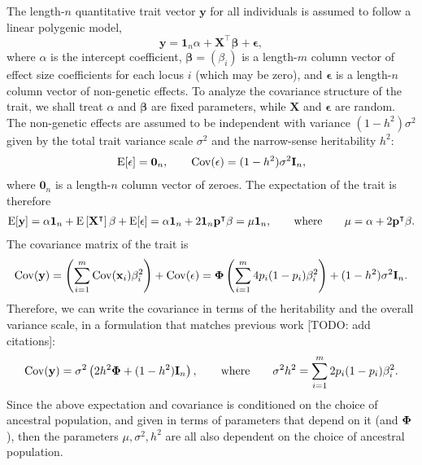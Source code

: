 \documentclass[11pt]{article}
\newcommand{\kinMat}{%
  \ensuremath{%
    \mathbf{\Phi}
  }%
  \xspace%
}%
\begin{document}
The length-$n$ quantitative trait vector $\mathbf{y}$ for all individuals is assumed to follow a linear polygenic model,
\begin{equation}
  \label{eq:trait}
  \mathbf{y}
  =
  \mathbf{1}_n \alpha + \mathbf{X}^\intercal \mathbf{\beta}  + \mathbf{\epsilon},
\end{equation}
where $\alpha$ is the intercept coefficient, $\mathbf{\beta} = (\beta_i)$ is a length-$m$ column vector of effect size coefficients for each locus $i$ (which may be zero), and $\mathbf{\epsilon}$ is a length-$n$ column vector of non-genetic effects.
To analyze the covariance structure of the trait, we shall treat $\alpha$ and $\mathbf{\beta}$ are fixed parameters, while $\mathbf{X}$ and $\mathbf{\epsilon}$ are random.
The non-genetic effects are assumed to be independent with variance $(1-h^2) \sigma^2$ given by the total trait variance scale $\sigma^2$ and the narrow-sense heritability $h^2$:
\begin{align*}
  \operatorname{E}[\mathbf{\epsilon}]
  =
  \mathbf{0}_n
  ,
  \quad\quad
  \operatorname{Cov}(\mathbf{\epsilon})
  =
  (1-h^2) \sigma^2 \mathbf{I}_n
  ,
\end{align*}
where $\mathbf{0}_n$ is a length-$n$ column vector of zeroes.
The expectation of the trait is therefore
\begin{align*}
  \operatorname{E}[\mathbf{y}]
  = \alpha \mathbf{1}_n + \operatorname{E} \left[ \mathbf{X}^\intercal \right] \mathbf{\beta} + \operatorname{E}[\mathbf{\epsilon}]
  = \alpha \mathbf{1}_n + 2 \mathbf{1}_n \mathbf{p}^\intercal \mathbf{\beta}
  = \mu \mathbf{1}_n
  , \quad\quad \text{where} \quad\quad
  \mu 
  =
  \alpha + 2 \mathbf{p}^\intercal \mathbf{\beta}
  .
\end{align*}
The covariance matrix of the trait is
\begin{align*}
  \Cov(\mathbf{y})
  =
  \left( \sum_{i=1}^m \Cov(\mathbf{x}_i) \beta_i^2 \right) + \Cov(\mathbf{\epsilon})
  =
  \kinMat \left( \sum_{i=1}^m 4 \pit (1-\pit) \beta_i^2 \right) + (1-h^2) \sigma^2 \mathbf{I}_n
  .
\end{align*}
Therefore, we can write the covariance in terms of the heritability and the overall variance scale, in a formulation that matches previous work [TODO: add citations]:
\begin{align*}
  \Cov(\mathbf{y})
  =
  \sigma^2 \left( 2 h^2 \kinMat  + (1-h^2) \mathbf{I}_n \right)
  , \quad\quad \text{where} \quad\quad
  \sigma^2 h^2 
  = 
  \sum_{i=1}^m 2 \pit (1-\pit) \beta_i^2
  .
\end{align*}
Since the above expectation and covariance is conditioned on the choice of ancestral population, and given in terms of parameters that depend on it (\pit and $\kinMat$), then the parameters $\mu, \sigma^2, h^2$ are all also dependent on the choice of ancestral population.
\end{document}
